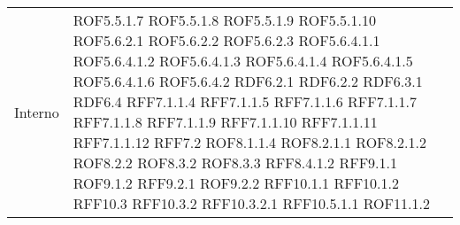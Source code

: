 \begin{center}
\begin{longtable}{| p{4cm} | p{4cm} |}
\hline
Interno & ROF5.5.1.7 \newline ROF5.5.1.8 \newline ROF5.5.1.9 \newline ROF5.5.1.10 \newline ROF5.6.2.1 \newline ROF5.6.2.2 \newline ROF5.6.2.3 \newline ROF5.6.4.1.1 \newline ROF5.6.4.1.2 \newline ROF5.6.4.1.3 \newline ROF5.6.4.1.4 \newline ROF5.6.4.1.5 \newline ROF5.6.4.1.6 \newline ROF5.6.4.2 \newline RDF6.2.1 \newline RDF6.2.2 \newline RDF6.3.1 \newline RDF6.4 \newline RFF7.1.1.4 \newline RFF7.1.1.5 \newline RFF7.1.1.6 \newline RFF7.1.1.7 \newline RFF7.1.1.8 \newline RFF7.1.1.9 \newline RFF7.1.1.10 \newline RFF7.1.1.11 \newline RFF7.1.1.12 \newline RFF7.2 \newline ROF8.1.1.4 \newline ROF8.2.1.1 \newline ROF8.2.1.2 \newline ROF8.2.2 \newline ROF8.3.2 \newline ROF8.3.3 \newline RFF8.4.1.2 \newline RFF9.1.1 \newline ROF9.1.2 \newline RFF9.2.1 \newline ROF9.2.2 \newline RFF10.1.1 \newline RFF10.1.2 \newline RFF10.3 \newline RFF10.3.2 \newline RFF10.3.2.1 \newline RFF10.5.1.1 \newline ROF11.1.2 \\

\end{longtable}
\end{center}
